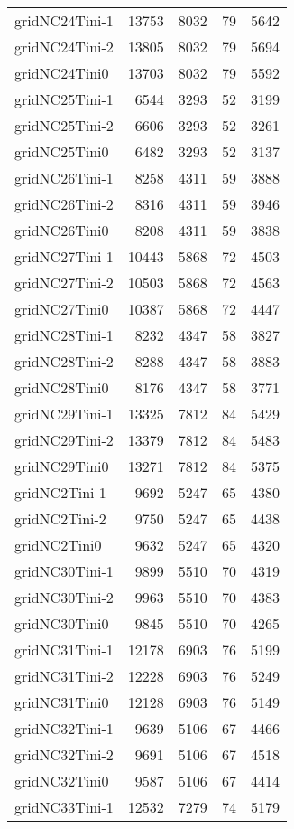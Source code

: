 \begin{longtable}{lrrrr}
gridNC24Tini-1 & 13753 & 8032 & 79 & 5642 \\
gridNC24Tini-2 & 13805 & 8032 & 79 & 5694 \\
gridNC24Tini0 & 13703 & 8032 & 79 & 5592 \\
gridNC25Tini-1 & 6544 & 3293 & 52 & 3199 \\
gridNC25Tini-2 & 6606 & 3293 & 52 & 3261 \\
gridNC25Tini0 & 6482 & 3293 & 52 & 3137 \\
gridNC26Tini-1 & 8258 & 4311 & 59 & 3888 \\
gridNC26Tini-2 & 8316 & 4311 & 59 & 3946 \\
gridNC26Tini0 & 8208 & 4311 & 59 & 3838 \\
gridNC27Tini-1 & 10443 & 5868 & 72 & 4503 \\
gridNC27Tini-2 & 10503 & 5868 & 72 & 4563 \\
gridNC27Tini0 & 10387 & 5868 & 72 & 4447 \\
gridNC28Tini-1 & 8232 & 4347 & 58 & 3827 \\
gridNC28Tini-2 & 8288 & 4347 & 58 & 3883 \\
gridNC28Tini0 & 8176 & 4347 & 58 & 3771 \\
gridNC29Tini-1 & 13325 & 7812 & 84 & 5429 \\
gridNC29Tini-2 & 13379 & 7812 & 84 & 5483 \\
gridNC29Tini0 & 13271 & 7812 & 84 & 5375 \\
gridNC2Tini-1 & 9692 & 5247 & 65 & 4380 \\
gridNC2Tini-2 & 9750 & 5247 & 65 & 4438 \\
gridNC2Tini0 & 9632 & 5247 & 65 & 4320 \\
gridNC30Tini-1 & 9899 & 5510 & 70 & 4319 \\
gridNC30Tini-2 & 9963 & 5510 & 70 & 4383 \\
gridNC30Tini0 & 9845 & 5510 & 70 & 4265 \\
gridNC31Tini-1 & 12178 & 6903 & 76 & 5199 \\
gridNC31Tini-2 & 12228 & 6903 & 76 & 5249 \\
gridNC31Tini0 & 12128 & 6903 & 76 & 5149 \\
gridNC32Tini-1 & 9639 & 5106 & 67 & 4466 \\
gridNC32Tini-2 & 9691 & 5106 & 67 & 4518 \\
gridNC32Tini0 & 9587 & 5106 & 67 & 4414 \\
gridNC33Tini-1 & 12532 & 7279 & 74 & 5179 \\

\end{longtable}
